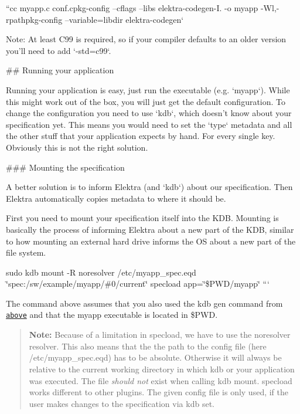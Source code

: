 ``{\ttfamily  cc myapp.\+c conf.\+c}pkg-\/config --cflags --libs elektra-\/codegen{\ttfamily -\/I. -\/o myapp -\/\+Wl,-\/rpath}pkg-\/config --variable=libdir elektra-\/codegen` 
\begin{DoxyCode}
Note: At least C99 is required, so if your compiler defaults to an older version you'll need to add
       `-std=c99`.

## Running your application

Running your application is easy, just run the executable (e.g. `myapp`). While this might work out of the
       box, you will just get the default
configuration. To change the configuration you need to use `kdb`, which doesn't know about your
       specification yet. This means you would need
to set the `type` metadata and all the other stuff that your application expects by hand. For every single
       key. Obviously this is not the
right solution.

### Mounting the specification

A better solution is to inform Elektra (and `kdb`) about our specification. Then Elektra automatically
       copies metadata to where it should be.

First you need to mount your specification itself into the KDB. Mounting is basically the process of
       informing Elektra about a new part of
the KDB, similar to how mounting an external hard drive informs the OS about a new part of the file system.
\end{DoxyCode}
 sudo kdb mount -\/R noresolver /etc/myapp\+\_\+spec.eqd \char`\"{}spec\+:/sw/example/myapp/\#0/current\char`\"{} specload app=\char`\"{}\$\+P\+W\+D/myapp\char`\"{} ```

The command above assumes that you also used the {\ttfamily kdb gen} command from \href{#invoking-the-code-generator}{\tt above} and that the {\ttfamily myapp} executable is located in {\ttfamily \$\+P\+WD}.

\begin{quote}
{\bfseries Note\+:} Because of a limitation in {\ttfamily specload}, we have to use the {\ttfamily noresolver} resolver. This also means that the the path to the config file (here {\ttfamily /etc/myapp\+\_\+spec.eqd}) has to be absolute. Otherwise it will always be relative to the current working directory in which {\ttfamily kdb} or your application was executed. The file {\itshape should not} exist when calling {\ttfamily kdb mount}. {\ttfamily specload} works different to other plugins. The given config file is only used, if the user makes changes to the specification via {\ttfamily kdb set}. \end{quote}


